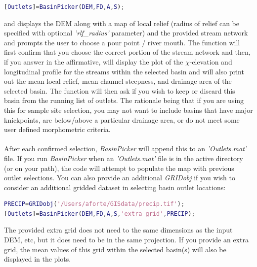\begin{lstlisting}[language=Matlab]
[Outlets]=BasinPicker(DEM,FD,A,S);
\end{lstlisting}

\noindent
 and displays the DEM along with a map of local relief (radius of relief can be specified with optional \textit{'rlf\_radius'} parameter) and the provided stream network and prompts the user to choose a pour point / river mouth. The function will first confirm that you choose the correct portion of the stream network and then, if you answer in the affirmative, will display the plot of the $\chi$-elevation and longitudinal profile for the streams within the selected basin and will also print out the mean local relief, mean channel steepness, and drainage area of the selected basin. The function will then ask if you wish to keep or discard this basin from the running list of outlets. The rationale being that if you are using this for sample site selection, you may not want to include basins that have major knickpoints, are below/above a particular drainage area, or do not meet some user defined morphometric criteria. 

\paragraph{}After each confirmed selection, \textit{BasinPicker} will append this to an \textit{'Outlets.mat'} file. If you run \textit{BasinPicker} when an \textit{'Outlets.mat'} file is in the active directory (or on your path), the code will attempt to populate the map with previous outlet selections. You can also provide an additional \textit{GRIDobj} if you wish to consider an additional gridded dataset in selecting basin outlet locations:

\begin{lstlisting}[language=Matlab]
PRECIP=GRIDobj('/Users/aforte/GISdata/precip.tif');
[Outlets]=BasinPicker(DEM,FD,A,S,'extra_grid',PRECIP);
\end{lstlisting}

\noindent
The provided extra grid does not need to the same dimensions as the input DEM, etc, but it does need to be in the same projection. If you provide an extra grid, the mean values of this grid within the selected basin(s) will also be displayed in the plots. 

